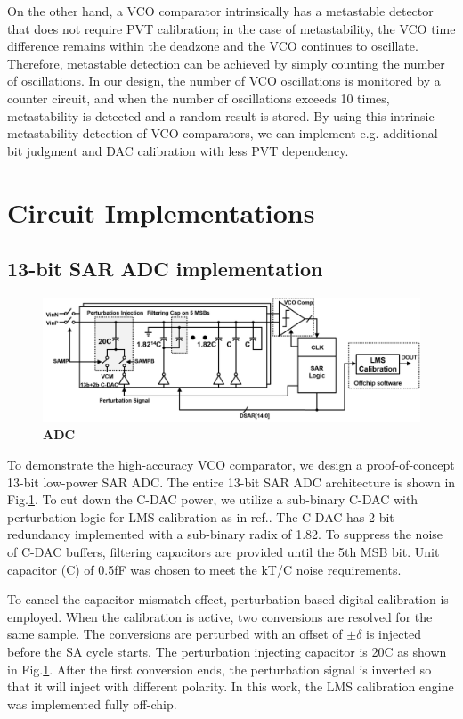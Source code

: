\documentclass[letterpaper, 10 pt, conference]{ieeeconf}  %
\begin{document}
On the other hand, a VCO comparator intrinsically has a metastable detector that does not require PVT calibration; in the case of metastability, the VCO time difference remains within the deadzone and the VCO continues to oscillate. Therefore, metastable detection can be achieved by simply counting the number of oscillations. In our design, the number of VCO oscillations is monitored by a counter circuit, and when the number of oscillations exceeds 10 times, metastability is detected and a random result is stored. By using this intrinsic metastability detection of VCO comparators, we can implement e.g. additional bit judgment \cite{shikata20120,ding20190} and DAC calibration \cite{zhu201914} with less PVT dependency.


\section{Circuit Implementations}
\subsection{13-bit SAR ADC implementation}

\begin{figure}[ht!]
\centering
 \includegraphics[width=1\textwidth]{figs/fig7.png}
  \captionsetup{font=footnotesize}
  \caption{\textbf{ADC}}
  \label{13bsar}
\end{figure}

To demonstrate the high-accuracy VCO comparator, we design a proof-of-concept 13-bit low-power SAR ADC.
The entire 13-bit SAR ADC architecture is shown in Fig.\ref{13bsar}. To cut down the C-DAC power, we utilize a sub-binary C-DAC with perturbation logic for LMS calibration as in ref.\cite{liu201012b}. The C-DAC has 2-bit redundancy implemented with a sub-binary radix of 1.82. To suppress the noise of C-DAC buffers, filtering capacitors\cite{miki20154} are provided until the 5th MSB bit. Unit capacitor (C) of 0.5fF was chosen to meet the kT/C noise requirements.

To cancel the capacitor mismatch effect, perturbation-based digital calibration\cite{liu201012b} is employed. When the calibration is active, two conversions are resolved for the same sample. The conversions are perturbed with an offset of $\pm \delta$ is injected before the SA cycle starts. The perturbation injecting capacitor is 20C as shown in Fig.\ref{13bsar}. After the first conversion ends, the perturbation signal is inverted so that it will inject with different polarity. In this work, the LMS calibration engine was implemented fully off-chip.
\end{document}
